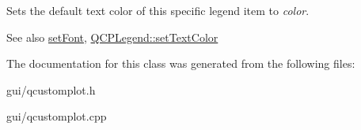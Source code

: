 Sets the default text color of this specific legend item to {\itshape color}.

\begin{DoxySeeAlso}{See also}
\hyperlink{classQCPAbstractLegendItem_a409c53455d8112f71d70c0c43eb10265}{set\+Font}, \hyperlink{classQCPLegend_ae1eb239ff4a4632fe1b6c3e668d845c6}{Q\+C\+P\+Legend\+::set\+Text\+Color} 
\end{DoxySeeAlso}


The documentation for this class was generated from the following files\+:\begin{DoxyCompactItemize}
\item 
gui/qcustomplot.\+h\item 
gui/qcustomplot.\+cpp\end{DoxyCompactItemize}
